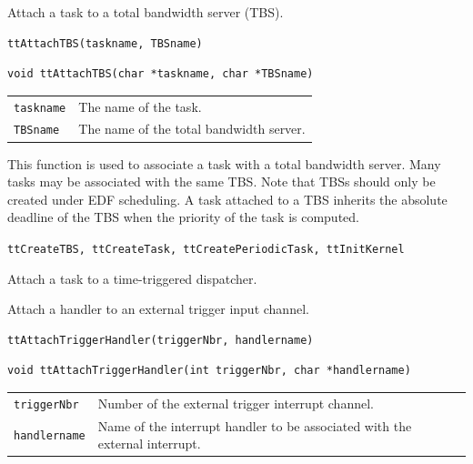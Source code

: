 \documentclass[final,twoside]{rapport}
\begin{document}
\purpose
Attach a task to a total bandwidth server (TBS). 

\Msyntax
\begin{verbatim}
ttAttachTBS(taskname, TBSname)
\end{verbatim}

\Csyntax
\begin{verbatim}
void ttAttachTBS(char *taskname, char *TBSname)
\end{verbatim}

\args
\begin{tabularx}{\hsize}{l>{\raggedright\arraybackslash}X}
  {\tt taskname} & The name of the task. \\
  {\tt TBSname} & The name of the total bandwidth server.
\end{tabularx}

\descr This function is used to associate a task with a total
bandwidth server. Many tasks may be associated with the same TBS. 
Note that TBSs should only be created under EDF scheduling. A task
attached to a TBS inherits the absolute deadline of the TBS when the
priority of the task is computed.

\seealso
{\tt ttCreateTBS, ttCreateTask, ttCreatePeriodicTask, ttInitKernel}



\purpose
Attach a task to a time-triggered dispatcher.





\purpose
Attach a handler to an external trigger input channel.

\Msyntax
\begin{verbatim}
ttAttachTriggerHandler(triggerNbr, handlername)
\end{verbatim}

\Csyntax
\begin{verbatim}
void ttAttachTriggerHandler(int triggerNbr, char *handlername)
\end{verbatim}

\args
\begin{tabularx}{\hsize}{l>{\raggedright\arraybackslash}X}
  {\tt triggerNbr} &  Number of the external trigger interrupt channel.\\
  {\tt handlername} & Name of the interrupt handler to be associated 
                  with the external interrupt.
\end{tabularx}
\end{document}
